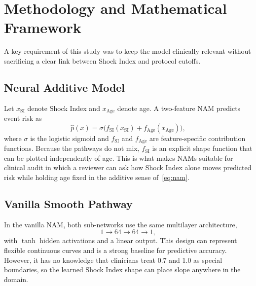 \documentclass[conference]{IEEEtran}
\begin{document}
\section{Methodology and Mathematical Framework}
A key requirement of this study was to keep the model clinically relevant without sacrificing a clear link between Shock Index and protocol cutoffs.

\subsection{Neural Additive Model}
Let $x_{\mathrm{SI}}$ denote Shock Index and $x_{\mathrm{Age}}$ denote age. A two-feature NAM predicts event risk as
\begin{equation}
\hat{p}(x)=\sigma\bigl(f_{\mathrm{SI}}(x_{\mathrm{SI}})+f_{\mathrm{Age}}(x_{\mathrm{Age}})\bigr),
\label{eq:nam}
\end{equation}
where $\sigma$ is the logistic sigmoid and $f_{\mathrm{SI}}$ and $f_{\mathrm{Age}}$ are feature-specific contribution functions. Because the pathways do not mix, $f_{\mathrm{SI}}$ is an explicit shape function that can be plotted independently of age. This is what makes NAMs suitable for clinical audit in which a reviewer can ask how Shock Index alone moves predicted risk while holding age fixed in the additive sense of~\eqref{eq:nam}.

\subsection{Vanilla Smooth Pathway}
In the vanilla NAM, both sub-networks use the same multilayer architecture,
\begin{equation}
1\rightarrow 64\rightarrow 64\rightarrow 1,
\label{eq:mlp}
\end{equation}
with $\tanh$ hidden activations and a linear output. This design can represent flexible continuous curves and is a strong baseline for predictive accuracy. However, it has no knowledge that clinicians treat 0.7 and 1.0 as special boundaries, so the learned Shock Index shape can place slope anywhere in the domain.
\end{document}
